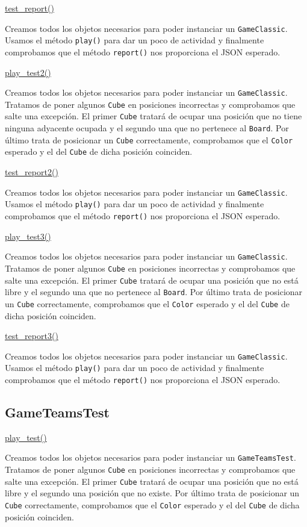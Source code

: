 \documentclass[../DocumentoOficial.tex]{subfiles}
\begin{document}
\underline{test\_report()}

Creamos todos los objetos necesarios para poder instanciar un \texttt{GameClassic}. Usamos el método \texttt{play()} para dar un poco de actividad y finalmente comprobamos que el método \texttt{report()} nos proporciona el JSON esperado.

\underline{play\_test2()}

Creamos todos los objetos necesarios para poder instanciar un \texttt{GameClassic}. Tratamos de poner algunos \texttt{Cube} en posiciones incorrectas y comprobamos que salte una excepción. El primer \texttt{Cube} tratará de ocupar una posición que no tiene ninguna adyacente ocupada y el segundo una que no pertenece al \texttt{Board}. Por último trata de posicionar un \texttt{Cube} correctamente, comprobamos que el \texttt{Color} esperado y el del \texttt{Cube} de dicha posición coinciden.

\underline{test\_report2()}

Creamos todos los objetos necesarios para poder instanciar un \texttt{GameClassic}. Usamos el método \texttt{play()} para dar un poco de actividad y finalmente comprobamos que el método \texttt{report()} nos proporciona el JSON esperado.

\underline{play\_test3()}

Creamos todos los objetos necesarios para poder instanciar un \texttt{GameClassic}. Tratamos de poner algunos \texttt{Cube} en posiciones incorrectas y comprobamos que salte una excepción. El primer \texttt{Cube} tratará de ocupar una posición que no está libre y el segundo una que no pertenece al \texttt{Board}. Por último trata de posicionar un \texttt{Cube} correctamente, comprobamos que el \texttt{Color} esperado y el del \texttt{Cube} de dicha posición coinciden.

\underline{test\_report3()}

Creamos todos los objetos necesarios para poder instanciar un \texttt{GameClassic}. Usamos el método \texttt{play()} para dar un poco de actividad y finalmente comprobamos que el método \texttt{report()} nos proporciona el JSON esperado.

\subsection{GameTeamsTest}
\underline{play\_test()}

Creamos todos los objetos necesarios para poder instanciar un \texttt{GameTeamsTest}. Tratamos de poner algunos \texttt{Cube} en posiciones incorrectas y comprobamos que salte una excepción. El primer \texttt{Cube} tratará de ocupar una posición que no está libre y el segundo una posición que no existe. Por último trata de posicionar un \texttt{Cube} correctamente, comprobamos que el \texttt{Color} esperado y el del \texttt{Cube} de dicha posición coinciden.
\end{document}
